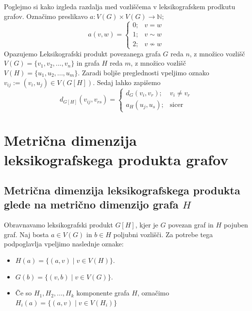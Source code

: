 \documentclass[mat1, tisk]{fmfdelo}
\begin{document}
Poglejmo si kako izgleda razdalja med vozliščema v leksikografskem prodkutu grafov. 
Označimo preslikavo  $a: V(G) \times V(G) \rightarrow \mathbb{N};$   
\begin{equation} \label{eq:fja_a} 
    a(v, w) = 
    \begin{cases}
        0; & v = w \\
        1; & v \sim w \\
        2; & v \not\sim w
    \end{cases} 
\end{equation} 
Opazujemo Leksikografski produkt povezanega grafa $G$ reda $n$, z množico vozlišč
$V(G) = \{v_1, v_2, ... , v_n \}$ in grafa $H$ reda $m$, z množico vozlišč 
$V(H) = \{u_1, u_2, ... , u_m \}$. Zaradi boljše preglednosti vpeljimo oznako 
$v_{ij} := (v_i, u_j) \in V(G[H]).$
Sedaj lahko zapišemo
\begin{equation} \label{eq:razdalja_produkta}
    d_{G[H]}(v_{ij}, v_{rs}) = 
    \begin{cases}
        d_G(v_i, v_r); & v_i \neq v_r \\
        a_H(u_j, u_s); & \text{sicer}
    \end{cases}
\end{equation} 




\section{Metrična dimenzija leksikografskega produkta grafov}\label{s:mdim_prod}
 



\subsection{Metrična dimenzija leksikografskega produkta glede na metrično dimenzijo grafa $H$} \label{ss:mdim_komp_prod}

Obravnavamo leksikografski produkt $G[H]$, kjer je $G$ povezan graf in $H$ pojuben 
graf. Naj bosta $a \in V(G)$ in $b \in H$ poljubni vozlišči. Za potrebe tega 
podpoglavlja vpeljimo naslednje oznake:
\begin{itemize}
    \item $H(a) = \{ (a, v) \; | \; v \in V(H) \}$.
    \item $G(b) = \{ (v, b) \; | \; v \in V(G) \}$.
    \item Če so $H_1, H_2, ..., H_k$ komponente grafa $H$, označimo 
    $H_i(a) = \{ (a, v) \; | \; v \in V(H_i) \}$
\end{itemize}
\end{document}

